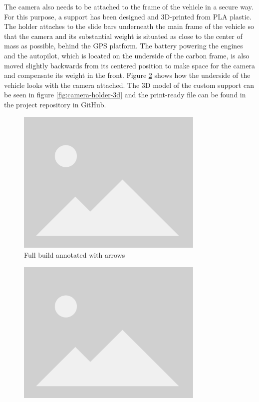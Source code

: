 The camera also needs to be attached to the frame of the vehicle in a secure way.
For this purpose, a support has been designed and 3D-printed from PLA plastic.
The holder attaches to the slide bars underneath the main frame of the vehicle so that the camera and its substantial weight is situated as close to the center of mass as possible, behind the GPS platform.
The battery powering the engines and the autopilot, which is located on the underside of the carbon frame, is also moved slightly backwards from its centered position to make space for the camera and compensate its weight in the front.
Figure \ref{fig:camera-holder-closeup} shows how the underside of the vehicle looks with the camera attached.
The 3D model of the custom support can be seen in figure \ref{fig:camera-holder-3d} and the print-ready file can be found in the project repository in GitHub. 

\begin{figure}
  \centering
  \includegraphics[width=0.8\textwidth, keepaspectratio]{img/placeholder.png}
  \caption{Full build annotated with arrows}\label{fig:full-build}
\end{figure}

\begin{figure}
  \centering
  \includegraphics[width=0.8\textwidth, keepaspectratio]{img/placeholder.png}
  \caption{}\label{fig:camera-holder-closeup}
\end{figure}

